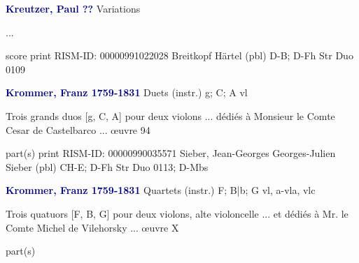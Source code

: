 \documentclass[twocolumn]{book}
\begin{document}
\newline \par \vspace{7pt} \textcolor{darkblue}{\textbf{Kreutzer, Paul  ??}}
\newline Variations    
\newline \begin{itshape}...\end{itshape} 
\newline \textcolor{darkblue}{}  score  
\newline print
\newline RISM-ID: 00000991022028
\newline Breitkopf  Härtel  (pbl)
\newline D-B; D-Fh  Str Duo 0109
\newline \par \vspace{7pt} \textcolor{darkblue}{\textbf{Krommer, Franz  1759-1831}}
\newline Duets (instr.)  g; C; A  
 vl
\newline \begin{itshape}Trois grands duos [g, C, A] pour deux violons ... dédiés à Monsieur le Comte Cesar de Castelbarco ... œuvre 94\end{itshape} 
\newline \textcolor{darkblue}{}  part(s)  
\newline print
\newline RISM-ID: 00000990035571
\newline Sieber, Jean-Georges  Georges-Julien Sieber  (pbl)
\newline CH-E; D-Fh  Str Duo 0113; D-Mbs
\newline \par \vspace{7pt} \textcolor{darkblue}{\textbf{Krommer, Franz  1759-1831}}
\newline Quartets (instr.)  F; B|b; G  
 vl, a-vla, vlc
\newline \begin{itshape}Trois quatuors [F, B, G] pour deux violons, alte  violoncelle ... et dédiés à Mr. le Comte Michel de Vilehorsky ... œuvre X\end{itshape} 
\newline \textcolor{darkblue}{}  part(s)  
\end{document}
